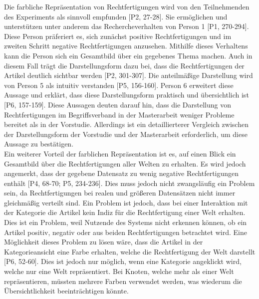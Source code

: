 Die farbliche Repräsentation von Rechtfertigungen wird von den Teilnehmenden des Experiments als sinnvoll empfunden [P2, 27-28].
Sie ermöglichen und unterstützen unter anderem das Rechercheverhalten von Person 1 [P1, 270-294]. %
Diese Person präferiert es, sich zunächst positive Rechtfertigungen und im zweiten Schritt negative Rechtfertigungen anzusehen.
Mithilfe dieses Verhaltens kann die Person sich ein Gesamtbild über ein gegebenes Thema machen.
Auch in diesem Fall trägt die Darstellungsform dazu bei, dass die Rechtfertigungen der Artikel deutlich sichtbar werden [P2, 301-307].
Die anteilmäßige Darstellung wird von Person 5 als intuitiv verstanden [P5, 156-160].
Person 6 erweitert diese Aussage und erklärt, dass diese Darstellungsform praktisch und übersichtlich ist [P6, 157-159].
Diese Aussagen deuten darauf hin, dass die Darstellung von Rechtfertigungen im Begriffsverband in der Masterarbeit weniger Probleme bereitet als in der Vorstudie.
Allerdings ist ein detaillierterer Vergleich zwischen der Darstellungsform der Vorstudie und der Masterarbeit erforderlich, um diese Aussage zu bestätigen. \\

Ein weiterer Vorteil der farblichen Repräsentation ist es, auf einen Blick ein Gesamtbild über die Rechtfertigungen aller Welten zu erhalten.
Es wird jedoch angemerkt, dass der gegebene Datensatz zu wenig negative Rechtfertigungen enthält [P4, 68-70; P5, 234-236].
Dies muss jedoch nicht zwangsläufig ein Problem sein, da Rechtfertigungen bei realen und größeren Datensätzen nicht immer gleichmäßig verteilt sind.
Ein Problem ist jedoch, dass bei einer Interaktion mit der Kategorie die Artikel kein Indiz für die Rechtfertigung einer Welt erhalten.
Dies ist ein Problem, weil Nutzende des Systems nicht erkennen können, ob ein Artikel positiv, negativ oder aus beiden Rechtfertigungen betrachtet wird.
Eine Möglichkeit dieses Problem zu lösen wäre, dass die Artikel in der Kategorieansicht eine Farbe erhalten, welche die Rechtfertigung der Welt darstellt [P6, 52-60].
Dies ist jedoch nur möglich, wenn eine Kategorie angeklickt wird, welche nur eine Welt repräsentiert.
Bei Knoten, welche mehr als einer Welt repräsentieren, müssten mehrere Farben verwendet werden, was wiederum die Übersichtlichkeit beeinträchtigen könnte.\\

